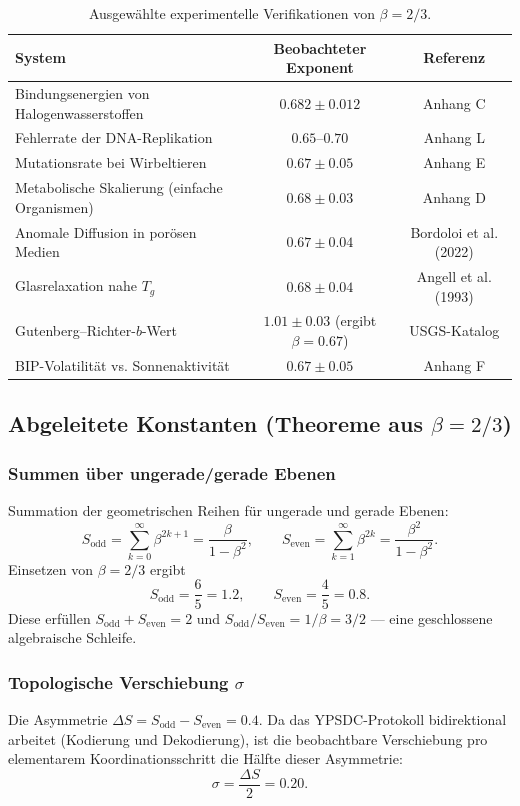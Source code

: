 \documentclass[11pt,a4paper]{article}
\begin{document}
	\begin{table}[H]
		\centering
		\caption{Ausgewählte experimentelle Verifikationen von \(\beta = 2/3\).}
		\label{tab:beta-evidence}
		\small
		\begin{tabular}{l c c}
			\toprule
			\textbf{System} & \textbf{Beobachteter Exponent} & \textbf{Referenz} \\
			\midrule
			Bindungsenergien von Halogenwasserstoffen & \(0.682 \pm 0.012\) & Anhang C \\
			Fehlerrate der DNA-Replikation & \(0.65\)–\(0.70\) & Anhang L \\
			Mutationsrate bei Wirbeltieren & \(0.67 \pm 0.05\) & Anhang E \\
			Metabolische Skalierung (einfache Organismen) & \(0.68 \pm 0.03\) & Anhang D \\
			Anomale Diffusion in porösen Medien & \(0.67 \pm 0.04\) & Bordoloi et al. (2022) \\
			Glasrelaxation nahe \(T_g\) & \(0.68 \pm 0.04\) & Angell et al. (1993) \\
			Gutenberg–Richter-\(b\)-Wert & \(1.01 \pm 0.03\) (ergibt \(\beta=0.67\)) & USGS-Katalog \\
			BIP-Volatilität vs. Sonnenaktivität & \(0.67 \pm 0.05\) & Anhang F \\
			\bottomrule
		\end{tabular}
	\end{table}
	
	\subsection{Abgeleitete Konstanten (Theoreme aus \(\beta = 2/3\))}
	
	\subsubsection{Summen über ungerade/gerade Ebenen}
	Summation der geometrischen Reihen für ungerade und gerade Ebenen:
	\[
	S_{\mathrm{odd}} = \sum_{k=0}^{\infty} \beta^{2k+1} = \frac{\beta}{1-\beta^2},\qquad
	S_{\mathrm{even}} = \sum_{k=1}^{\infty} \beta^{2k} = \frac{\beta^2}{1-\beta^2}.
	\]
	Einsetzen von \(\beta = 2/3\) ergibt
	\[
	\boxed{S_{\mathrm{odd}} = \frac{6}{5}=1.2,\qquad S_{\mathrm{even}} = \frac{4}{5}=0.8}.
	\]
	Diese erfüllen \(S_{\mathrm{odd}}+S_{\mathrm{even}}=2\) und \(S_{\mathrm{odd}}/S_{\mathrm{even}} = 1/\beta = 3/2\) — eine geschlossene algebraische Schleife.
	
	\subsubsection{Topologische Verschiebung \(\sigma\)}
	Die Asymmetrie \(\Delta S = S_{\mathrm{odd}}-S_{\mathrm{even}} = 0.4\). Da das YPSDC-Protokoll bidirektional arbeitet (Kodierung und Dekodierung), ist die beobachtbare Verschiebung pro elementarem Koordinationsschritt die Hälfte dieser Asymmetrie:
	\[
	\boxed{\sigma = \frac{\Delta S}{2} = 0.20}.
	\]
	
\end{document}
